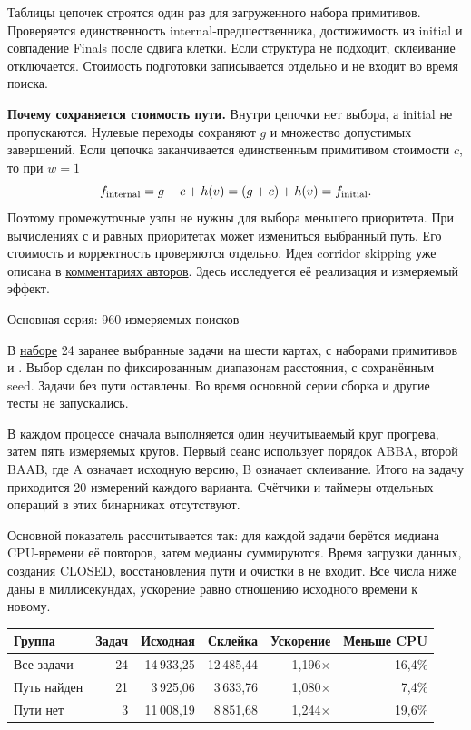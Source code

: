 \documentclass[11pt,a4paper]{article}
\newcommand{\code}[1]{\texttt{\detokenize{#1}}}
\begin{document}
Таблицы цепочек строятся один раз для загруженного набора примитивов. Проверяется единственность internal-предшественника, достижимость из initial и совпадение Finals после сдвига клетки. Если структура не подходит, склеивание отключается. Стоимость подготовки записывается отдельно и не входит во время поиска.

\textbf{Почему сохраняется стоимость пути.} Внутри цепочки нет выбора, а initial не пропускаются. Нулевые переходы сохраняют \(g\) и множество допустимых завершений. Если цепочка заканчивается единственным примитивом стоимости \(c\), то при \(w=1\)
\[
 f_{\rm internal}=g+c+h(v)=(g+c)+h(v)=f_{\rm initial}.
\]
Поэтому промежуточные узлы не нужны для выбора меньшего приоритета. При вычислениях с \code{float} и равных приоритетах может измениться выбранный путь. Его стоимость и корректность проверяются отдельно. Идея corridor skipping уже описана в \href{https://github.com/PathPlanning/MeshAStar/blob/main/src/KC_search_params.cpp}{комментариях авторов}. Здесь исследуется её реализация и измеряемый эффект.

\newpage
{\Large Основная серия: 960 измеряемых поисков}\par

В \href{../core.tsv}{наборе} 24 заранее выбранные задачи на шести картах, с наборами примитивов \code{base} и \code{add}. Выбор сделан по фиксированным диапазонам расстояния, с сохранённым seed. Задачи без пути оставлены. Во время основной серии сборка и другие тесты не запускались.

В каждом процессе сначала выполняется один неучитываемый круг прогрева, затем пять измеряемых кругов. Первый сеанс использует порядок ABBA, второй BAAB, где A означает исходную версию, B означает склеивание. Итого на задачу приходится 20 измерений каждого варианта. Счётчики и таймеры отдельных операций в этих бинарниках отсутствуют.

Основной показатель рассчитывается так: для каждой задачи берётся медиана CPU-времени её повторов, затем медианы суммируются. Время загрузки данных, создания CLOSED, восстановления пути и очистки в \code{AstarSearch} не входит. Все числа ниже даны в миллисекундах, ускорение равно отношению исходного времени к новому.

\begin{center}\small
\begin{tabular}{@{}lrrrrr@{}}
\toprule
Группа & Задач & Исходная & Склейка & Ускорение & Меньше CPU \\
\midrule
Все задачи & 24 & 14\,933,25 & 12\,485,44 & 1,196$\times$ & 16,4\% \\
Путь найден & 21 & 3\,925,06 & 3\,633,76 & 1,080$\times$ & 7,4\% \\
Пути нет & 3 & 11\,008,19 & 8\,851,68 & 1,244$\times$ & 19,6\% \\
\bottomrule
\end{tabular}
\end{center}
\end{document}
